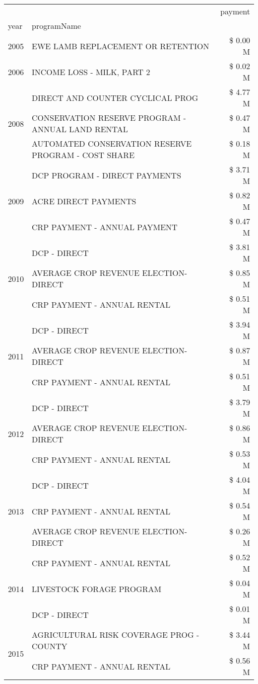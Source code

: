 \begin{tabular}{llr}
\toprule
 &  & payment \\
year & programName &  \\
\midrule
2005 & EWE LAMB REPLACEMENT OR RETENTION & \$ 0.00 M \\
\cline{1-3}
2006 & INCOME LOSS - MILK, PART 2 & \$ 0.02 M \\
\cline{1-3}
\multirow[t]{3}{*}{2008} & DIRECT AND COUNTER CYCLICAL PROG & \$ 4.77 M \\
 & CONSERVATION RESERVE PROGRAM - ANNUAL LAND RENTAL & \$ 0.47 M \\
 & AUTOMATED CONSERVATION RESERVE PROGRAM - COST SHARE & \$ 0.18 M \\
\cline{1-3}
\multirow[t]{3}{*}{2009} & DCP PROGRAM - DIRECT PAYMENTS & \$ 3.71 M \\
 & ACRE DIRECT PAYMENTS & \$ 0.82 M \\
 & CRP PAYMENT - ANNUAL PAYMENT & \$ 0.47 M \\
\cline{1-3}
\multirow[t]{3}{*}{2010} & DCP - DIRECT & \$ 3.81 M \\
 & AVERAGE CROP REVENUE ELECTION-DIRECT & \$ 0.85 M \\
 & CRP PAYMENT - ANNUAL RENTAL & \$ 0.51 M \\
\cline{1-3}
\multirow[t]{3}{*}{2011} & DCP - DIRECT & \$ 3.94 M \\
 & AVERAGE CROP REVENUE ELECTION-DIRECT & \$ 0.87 M \\
 & CRP PAYMENT - ANNUAL RENTAL & \$ 0.51 M \\
\cline{1-3}
\multirow[t]{3}{*}{2012} & DCP - DIRECT & \$ 3.79 M \\
 & AVERAGE CROP REVENUE ELECTION-DIRECT & \$ 0.86 M \\
 & CRP PAYMENT - ANNUAL RENTAL & \$ 0.53 M \\
\cline{1-3}
\multirow[t]{3}{*}{2013} & DCP - DIRECT & \$ 4.04 M \\
 & CRP PAYMENT - ANNUAL RENTAL & \$ 0.54 M \\
 & AVERAGE CROP REVENUE ELECTION-DIRECT & \$ 0.26 M \\
\cline{1-3}
\multirow[t]{3}{*}{2014} & CRP PAYMENT - ANNUAL RENTAL & \$ 0.52 M \\
 & LIVESTOCK FORAGE PROGRAM & \$ 0.04 M \\
 & DCP - DIRECT & \$ 0.01 M \\
\cline{1-3}
\multirow[t]{3}{*}{2015} & AGRICULTURAL RISK COVERAGE PROG - COUNTY & \$ 3.44 M \\
 & CRP PAYMENT - ANNUAL RENTAL & \$ 0.56 M \\

\end{tabular}
